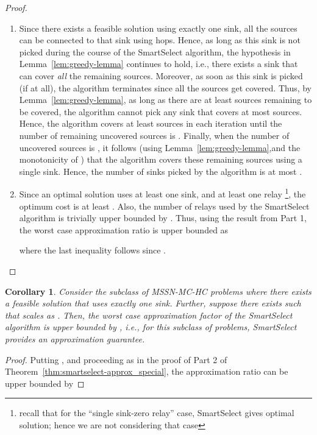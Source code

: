 \documentclass[conference]{IEEEtran}
\newtheorem{corollary}{Corollary}
\begin{document}
\begin{proof}
\begin{enumerate}
\item Since there exists a feasible solution using exactly one sink, all the  sources can be connected to that sink using  hops. Hence, as long as this sink is not picked during the course of the SmartSelect algorithm, the hypothesis in Lemma~\ref{lem:greedy-lemma} continues to hold, i.e., there exists a sink that can cover \emph{all} the remaining sources. Moreover, as soon as this sink is picked (if at all), the algorithm terminates since all the sources get covered. Thus, by Lemma~\ref{lem:greedy-lemma}, as long as there are at least  sources remaining to be covered, the algorithm cannot pick any sink that covers at most  sources. Hence, the algorithm covers at least  sources in each iteration until the number of remaining uncovered sources is . Finally, when the number of uncovered sources is , it follows (using Lemma~\ref{lem:greedy-lemma},and the monotonicity of ) that the algorithm covers these remaining sources using a single sink. Hence, the number of sinks picked by the algorithm is at most .
\item Since an optimal solution uses at least one sink, and at least one relay \footnote{recall that for the ``single sink-zero relay'' case, SmartSelect gives optimal solution; hence we are not considering that case}, the optimum cost is at least . Also, the number of relays used by the SmartSelect algorithm is trivially upper bounded by . Thus, using the result from Part 1, the worst case approximation ratio is upper bounded as

where the last inequality follows since . 
\end{enumerate} 
\end{proof}

\begin{corollary}
Consider the subclass of MSSN-MC-HC problems where there exists a feasible solution that uses exactly one sink. Further, suppose there exists  such that  scales as . Then, the worst case approximation factor of the SmartSelect algorithm is upper bounded by , i.e., for this subclass of problems, SmartSelect provides an  approximation guarantee.
\end{corollary}

\begin{proof}
Putting , and proceeding as in the proof of Part 2 of Theorem~\ref{thm:smartselect-approx_special}, the approximation ratio can be upper bounded by


\end{proof}
\end{document}
